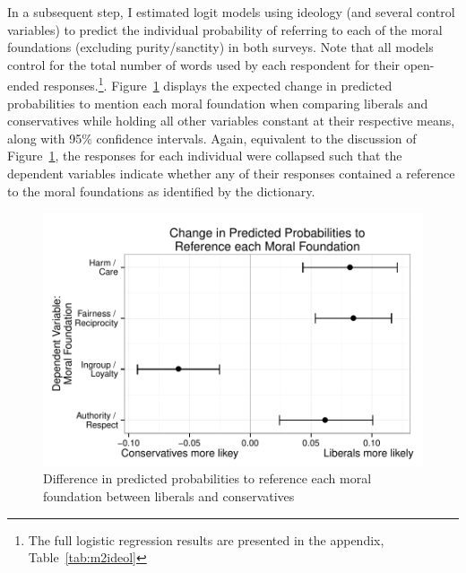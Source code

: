 \documentclass[12pt]{article}
\begin{document}
In a subsequent step, I estimated logit models using ideology (and several control variables) to predict the individual probability of referring to each of the moral foundations (excluding purity/sanctity) in both surveys. Note that all models control for the total number of words used by each respondent for their open-ended responses.\footnote{The full logistic regression results are presented in the appendix, Table~\ref{tab:m2ideol}}. Figure~\ref{fig:2ideol} displays the expected change in predicted probabilities to mention each moral foundation when comparing liberals and conservatives while holding all other variables constant at their respective means, along with 95\% confidence intervals. Again, equivalent to the discussion of Figure~\ref{fig:2ideol}, the responses for each individual were collapsed such that the dependent variables indicate whether any of their responses contained a reference to the moral foundations as identified by the dictionary. 

\begin{figure}\centering
\includegraphics{../calc/fig/fig2ideol.pdf}
\caption{Difference in predicted probabilities to reference each moral foundation between liberals and conservatives}\label{fig:2ideol}
\end{figure}
\end{document}
